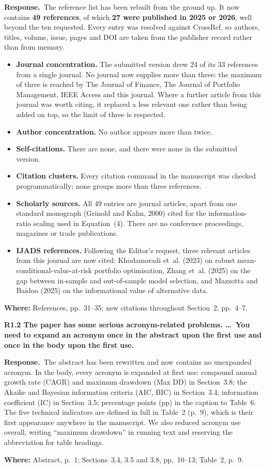 \documentclass[11pt,a4paper]{article}
\newcommand{\rc}[1]{\par\medskip\noindent\textbf{#1}\par\nopagebreak}
\newcommand{\resp}{\par\noindent\textbf{Response.}\ }
\newcommand{\where}[1]{\par\smallskip\noindent\textcolor{blue!55!black}{\textbf{Where:} #1}\par}
\begin{document}
\resp The reference list has been rebuilt from the ground up. It now contains
\textbf{49 references}, of which \textbf{27 were published in 2025 or 2026}, well beyond
the ten requested. Every entry was resolved against CrossRef, so authors, titles,
volume, issue, pages and DOI are taken from the publisher record rather than from
memory.

\begin{itemize}
\item \textbf{Journal concentration.} The submitted version drew 24 of its 33 references
from a single journal. No journal now supplies more than three: the maximum of three is
reached by The Journal of Finance, The Journal of Portfolio Management, IEEE Access and
this journal. Where a further article from this journal was worth citing, it replaced a
less relevant one rather than being added on top, so the limit of three is respected.
\item \textbf{Author concentration.} No author appears more than twice.
\item \textbf{Self-citations.} There are none, and there were none in the submitted
version.
\item \textbf{Citation clusters.} Every citation command in the manuscript was checked
programmatically; none groups more than three references.
\item \textbf{Scholarly sources.} All 49 entries are journal articles, apart from one
standard monograph (Grinold and Kahn, 2000) cited for the information-ratio scaling used
in Equation~(4). There are no conference proceedings, magazines or trade publications.
\item \textbf{IJADS references.} Following the Editor's request, three relevant articles
from this journal are now cited: Khodamoradi et~al. (2023) on robust
mean-conditional-value-at-risk portfolio optimisation, Zhang et~al. (2025) on the gap
between in-sample and out-of-sample model selection, and Mazzotta and Baidoo (2025) on
the informational value of alternative data.
\end{itemize}
\where{References, pp.~31--35; new citations throughout Section~2, pp.~4--7.}

\rc{R1.2 The paper has some serious acronym-related problems. \dots\ You need to expand
an acronym once in the abstract upon the first use and once in the body upon the first
use.}

\resp The abstract has been rewritten and now contains no unexpanded acronym. In the
body, every acronym is expanded at first use: compound annual growth rate (CAGR) and
maximum drawdown (Max DD) in Section~3.8; the Akaike and Bayesian information criteria
(AIC, BIC) in Section~3.4; information coefficient (IC) in Section~3.5; percentage
points (pp) in the caption to Table~6. The five technical indicators are defined in full
in Table~2 (p.~9), which is their first appearance anywhere in the manuscript. We also
reduced acronym use overall, writing ``maximum drawdown'' in running text and reserving
the abbreviation for table headings.
\where{Abstract, p.~1; Sections~3.4, 3.5 and 3.8, pp.~10--13; Table~2, p.~9.}
\end{document}
